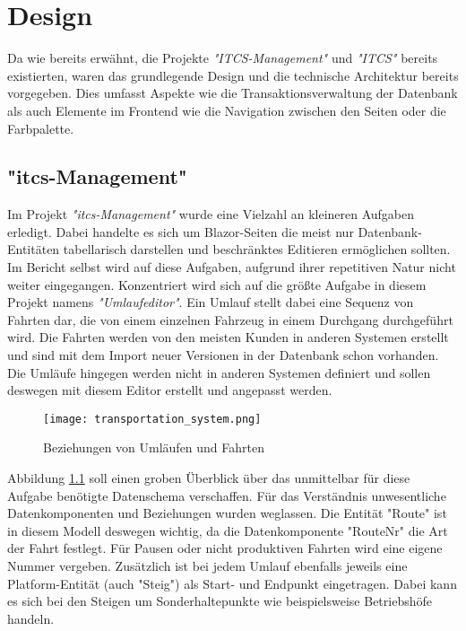 \chapter{Design}\label{chap:design}

    Da wie bereits erwähnt, die Projekte \emph{"ITCS-Management"} und \emph{"ITCS"} bereits existierten, waren das grundlegende Design und die technische Architektur bereits vorgegeben.
    Dies umfasst Aspekte wie die Transaktionsverwaltung der Datenbank als auch Elemente im Frontend wie die Navigation zwischen den Seiten oder die Farbpalette.

\section{"itcs-Management"}\label{sec:itcs-management-design}
    Im Projekt \emph{"itcs-Management"} wurde eine Vielzahl an kleineren Aufgaben erledigt. Dabei handelte es sich um Blazor-Seiten die meist nur Datenbank-Entitäten tabellarisch
    darstellen und beschränktes Editieren ermöglichen sollten. Im Bericht selbst wird auf diese Aufgaben, aufgrund ihrer repetitiven Natur nicht weiter eingegangen. Konzentriert wird sich 
    auf die größte Aufgabe in diesem Projekt namens \emph{"Umlaufeditor"}. 
    Ein Umlauf stellt dabei eine Sequenz von Fahrten dar, die von einem einzelnen Fahrzeug in einem Durchgang durchgeführt wird. Die Fahrten werden von den meisten Kunden in anderen 
    Systemen erstellt und sind mit dem Import neuer Versionen in der Datenbank schon vorhanden. Die Umläufe hingegen werden nicht in anderen Systemen definiert und sollen deswegen
    mit diesem Editor erstellt und angepasst werden. 
    \begin{figure}[H]
        \centering
        \texttt{[image: transportation\_system.png]}
        \caption{Beziehungen von Umläufen und Fahrten}
        \label{fig:BeziehungenvonUmläufenundFahrten}
    \end{figure}

    Abbildung \ref{fig:BeziehungenvonUmläufenundFahrten} soll einen groben Überblick über das unmittelbar für diese Aufgabe benötigte Datenschema verschaffen. Für das Verständnis unwesentliche 
    Datenkomponenten und Beziehungen wurden weglassen. Die Entität "Route" ist in diesem Modell deswegen wichtig, da die Datenkomponente "RouteNr" die Art der Fahrt festlegt. Für Pausen oder nicht produktiven
    Fahrten wird eine eigene Nummer vergeben. Zusätzlich ist bei jedem Umlauf ebenfalls jeweils eine Platform-Entität (auch "Steig") als Start- und Endpunkt eingetragen. Dabei kann es sich bei den 
    Steigen um Sonderhaltepunkte wie beispielsweise Betriebshöfe handeln.

